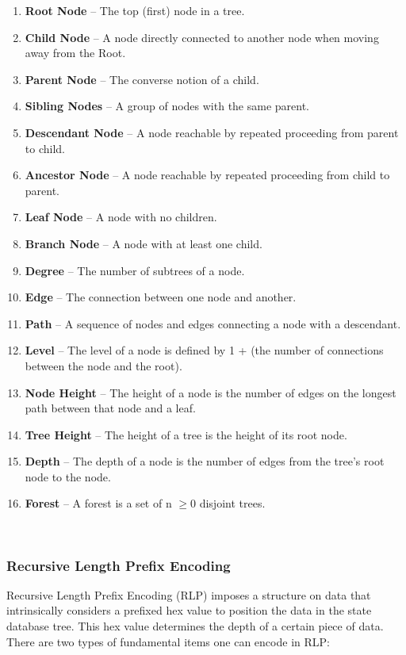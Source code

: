 \documentclass[10pt,letterpaper,leqno,bibliography=totoc]{scrartcl}
\newenvironment{alphafootnotes}
{\par\edef\savedfootnotenumber{\number\value{footnote}}
\renewcommand{\thefootnote}{\alph{footnote}}
\setcounter{footnote}{0}}
{\par\setcounter{footnote}{\savedfootnotenumber}}
\begin{document}
\begin{alphafootnotes}
\begin{multicols*}{2}
	\begin{enumerate}[label=\textbf{\alph*})]
		\item \textbf{Root Node} --  The top (first) node in a tree.
		\item \textbf{Child Node} --  A node directly connected to another node when moving away from the Root.
		\item \textbf{Parent Node} --  The converse notion of a child.
		\item \textbf{Sibling Nodes} --  A group of nodes with the same parent.
		\item \textbf{Descendant Node} --  A node reachable by repeated proceeding from parent to child.
		\item \textbf{Ancestor Node} --  A node reachable by repeated proceeding from child to parent.
		\item \textbf{Leaf Node} --  A node with no children.
		\item \textbf{Branch Node} --  A node with at least one child.
		\item \textbf{Degree} --  The number of subtrees of a node.
		\item \textbf{Edge} --  The connection between one node and another.
		\item \textbf{Path} --  A sequence of nodes and edges connecting a node with a descendant.
		\item \textbf{Level} --  The level of a node is defined by 1 + (the number of connections between the node and the root).
		\item \textbf{Node Height} --  The height of a node is the number of edges on the longest path between that node and a leaf.
		\item \textbf{Tree Height} --  The height of a tree is the height of its root node.
		\item \textbf{Depth} --  The depth of a node is the number of edges from the tree's root node to the node.
		\item \textbf{Forest} -- A forest is a set of n $\geq  0$ disjoint trees.
	\end{enumerate}
	\hfill 
	\\

			\subsubsection{Recursive Length Prefix Encoding}
				Recursive Length Prefix Encoding (RLP) imposes a structure on data that intrinsically considers a prefixed hex value to position the data in the state database tree. This hex value determines the depth of a certain piece of data. There are two types of fundamental items one can encode in RLP:\supercite{jnnk}


\end{multicols*}
\end{alphafootnotes}
\end{document}
